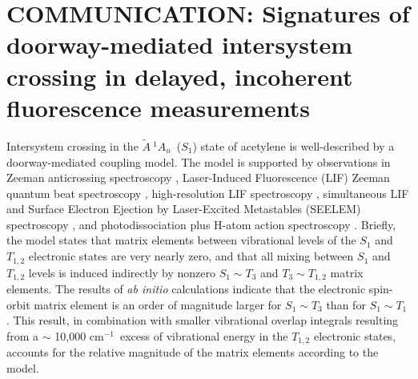 \documentclass[12pt]{mitthesis}
\newcommand{\rcm}{cm$^{-1}$}
\newcommand{\astate}{$
  \tilde{A} \: ^1\!A_u
  $}
\begin{document}

\section{COMMUNICATION: Signatures of doorway-mediated intersystem
  crossing in delayed, incoherent fluorescence measurements}

Intersystem crossing in the \astate\ ($S_1$) state of acetylene is
well-described by a doorway-mediated coupling model.  The model is
supported by observations in Zeeman anticrossing spectroscopy
\cite{dupre91, dupre95a, dupre95b}, Laser-Induced Fluorescence (LIF)
Zeeman quantum beat spectroscopy \cite{ochi87, ochi91, dupre93},
high-resolution LIF spectroscopy \cite{drabbels94, altunata01},
simultaneous LIF and Surface Electron Ejection by Laser-Excited
Metastables (SEELEM) spectroscopy \cite{humphrey97, altunata00,
  mishra04}, and photodissociation plus H-atom action spectroscopy
\cite{yamakita03, loffler98, mordaunt98}.  Briefly, the model states
that matrix elements between vibrational levels of the $S_1$ and
$T_{1,2}$ electronic states are very nearly zero, and that all mixing
between $S_1$ and $T_{1,2}$ levels is induced indirectly by nonzero
$S_1 \sim T_3$ and $T_3 \sim T_{1,2}$ matrix elements.  The results of
\emph{ab initio} calculations indicate that the electronic spin-orbit
matrix element is an order of magnitude larger for $S_1 \sim T_3$ than
for $S_1 \sim T_1$.  This result, in combination with smaller
vibrational overlap integrals resulting from a $\sim$ 10,000 \rcm\
excess of vibrational energy in the $T_{1,2}$ electronic states,
accounts for the relative magnitude of the matrix elements according
to the model.
\end{document}
